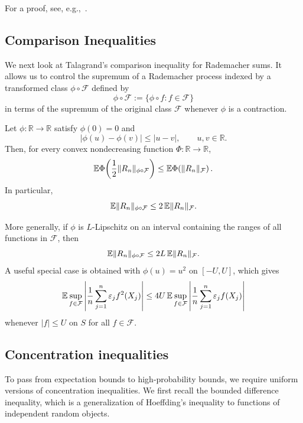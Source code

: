 For a proof, see, e.g.,~\cite[Section 2.3]{van1996weak}.

\subsection{Comparison Inequalities}

We next look at Talagrand's comparison inequality for Rademacher sums. It allows us to control the supremum of a Rademacher process indexed by a transformed class $\phi\circ\mathcal F$ defined by
\[
  \phi\circ\mathcal F:=\{\phi\circ f:f\in\mathcal F\}
\]
in terms of the supremum of the original class $\mathcal F$ whenever $\phi$ is a contraction.

\begin{theorem}\label{thm:comparison}
  Let $\phi:\mathbb R\to\mathbb R$ satisfy $\phi(0)=0$ and
  \[
    |\phi(u)-\phi(v)|\le |u-v|, \qquad u,v\in\mathbb R.
  \]
  Then, for every convex nondecreasing function $\Phi:\mathbb R\to\mathbb R$,
  \[
    \mathbb{E} \Phi\!\left(\frac12 \|R_n\|_{\phi\circ \mathcal F}\right)
    \le
    \mathbb{E} \Phi\!\left(\|R_n\|_{\mathcal F}\right).
  \]
  In particular,
  \[
    \mathbb{E}\|R_n\|_{\phi\circ \mathcal F}\le 2\,\mathbb{E}\|R_n\|_{\mathcal F}.
  \]
\end{theorem}

More generally, if $\phi$ is $L$-Lipschitz on an interval containing the ranges of all functions in $\mathcal F$, then
\begin{equation} \label{eq:comparison-lipschitz}
  \mathbb{E}\|R_n\|_{\phi\circ\mathcal F}\le 2L\,\mathbb{E}\|R_n\|_{\mathcal F}.
\end{equation}
A useful special case is obtained with $\phi(u)=u^2$ on $[-U,U]$, which gives
\begin{equation} \label{eq:comparison-square}
  \mathbb{E}\sup_{f\in\mathcal F}\left|\frac1n\sum_{j=1}^n \varepsilon_j f^2(X_j)\right|
  \le
  4U\,\mathbb{E}\sup_{f\in\mathcal F}\left|\frac1n\sum_{j=1}^n \varepsilon_j f(X_j)\right|
\end{equation}
whenever $|f|\le U$ on $S$ for all $f\in\mathcal F$.

\subsection{Concentration inequalities}

To pass from expectation bounds to high-probability bounds, we require uniform versions of concentration inequalities. We first recall the bounded difference inequality, which is a generalization of Hoeffding's inequality to functions of independent random objects.


